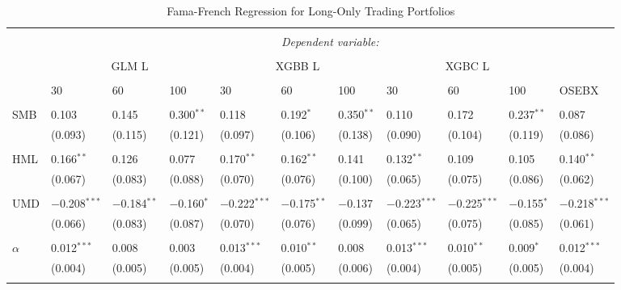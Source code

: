 \begin{table}[H] 
  \caption{Fama-French Regression for Long-Only Trading Portfolios} 
  \label{table:FAMA-FRENCH-LONG-ONLY-TRADING-FINAL} 
\begin{tabularx}{\textwidth}{XXXXXXXXXXl} 
\\[-1.8ex]\hline 
\hline \\[-1.8ex] 
 & \multicolumn{10}{c}{\textit{Dependent variable:}} \\ 
\cline{2-11} 
\\[-1.8ex] 
& \multicolumn{3}{c}{GLM L} & \multicolumn{3}{c}{XGBB L} & \multicolumn{3}{c}{XGBC L} & \\
\cline{2-11}
\\[-1.8ex] 
& 30 & 60 & 100 & 30 & 60 & 100 & 30 & 60 & 100 & OSEBX \\ 
\cline{2-11} \\
 SMB & 0.103 & 0.145 & 0.300$^{**}$ & 0.118 & 0.192$^{*}$ & 0.350$^{**}$ & 0.110 & 0.172 & 0.237$^{**}$ & 0.087 \\ 
  & (0.093) & (0.115) & (0.121) & (0.097) & (0.106) & (0.138) & (0.090) & (0.104) & (0.119) & (0.086) \\ 
  & & & & & & & & & & \\ 
 HML & 0.166$^{**}$ & 0.126 & 0.077 & 0.170$^{**}$ & 0.162$^{**}$ & 0.141 & 0.132$^{**}$ & 0.109 & 0.105 & 0.140$^{**}$ \\ 
  & (0.067) & (0.083) & (0.088) & (0.070) & (0.076) & (0.100) & (0.065) & (0.075) & (0.086) & (0.062) \\ 
  & & & & & & & & & & \\ 
 UMD & $-$0.208$^{***}$ & $-$0.184$^{**}$ & $-$0.160$^{*}$ & $-$0.222$^{***}$ & $-$0.175$^{**}$ & $-$0.137 & $-$0.223$^{***}$ & $-$0.225$^{***}$ & $-$0.155$^{*}$ & $-$0.218$^{***}$  \\ 
  & (0.066) & (0.083) & (0.087) & (0.070) & (0.076) & (0.099) & (0.065) & (0.075) & (0.085) & (0.061) \\ 
  & & & & & & & & & & \\ 
 $\alpha$ & 0.012$^{***}$ & 0.008 & 0.003 & \cellcolor{lightlightgreen}0.013$^{***}$ & 0.010$^{**}$ & 0.008 & \cellcolor{lightlightgreen}0.013$^{***}$ & 0.010$^{**}$ & 0.009$^{*}$ & 0.012$^{***}$ \\ 
  & (0.004) & (0.005) & (0.005) & (0.004) & (0.005) & (0.006) & (0.004) & (0.005) & (0.005) & (0.004) \\ 
  & & & & & & & & & & \\ 

\end{tabularx}
\end{table}
